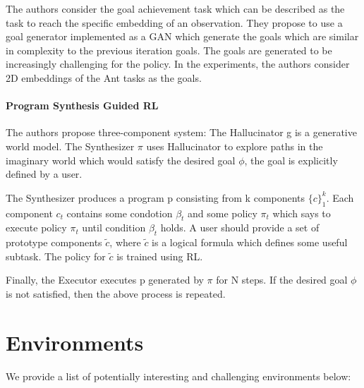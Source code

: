 \documentclass[acmsmall, nonacm]{acmart}
\begin{document}
The authors consider the goal achievement task which can be described as the task to reach the specific embedding of an observation. They propose to use a goal generator implemented as a GAN which generate the goals which are similar in complexity to the previous iteration goals. The goals are generated to be increasingly challenging for the policy. In the experiments, the authors consider 2D embeddings of the Ant tasks as the goals.


\paragraph{Program Synthesis Guided RL \citet{Yang2021ProgramSG}}

The authors propose three-component system: The Hallucinator g is a generative world model. The Synthesizer $\pi$ uses Hallucinator to explore paths in the imaginary world which would satisfy the desired goal $\phi$, the goal is explicitly defined by a user.

The Synthesizer produces a program p consisting from k components $\{c\}_1^k$. Each component $c_t$ contains some condotion $\beta_t$ and some policy $\pi_t$ which says to execute policy $\pi_t$ until condition $\beta_t$ holds. A user should provide a set of prototype components $\tilde{c}$, where $\tilde{c}$ is a logical formula which defines some useful subtask. The policy for $\tilde{c}$ is trained using RL.

Finally, the Executor executes p generated by $\pi$ for N steps. If the desired goal $\phi$ is not satisfied, then the above process is repeated.


\section{Environments} %
\label{sec:environments}

We provide a list of potentially interesting and challenging environments below:
\end{document}

